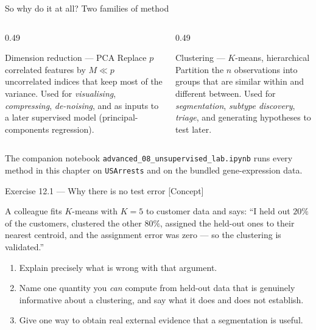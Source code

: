 \documentclass[aspectratio=169,11pt]{beamer}
\begin{document}
\begin{frame}{So why do it at all? Two families of method}
  \footnotesize
  \begin{columns}[t]
    \begin{column}{0.49\textwidth}
      \begin{block}{Dimension reduction --- PCA}
        \footnotesize
        Replace $p$ correlated features by $M \ll p$ uncorrelated indices that keep most of
        the variance. Used for \emph{visualising}, \emph{compressing}, \emph{de-noising},
        and as inputs to a later supervised model (principal-components regression).
      \end{block}
    \end{column}
    \begin{column}{0.49\textwidth}
      \begin{block}{Clustering --- $K$-means, hierarchical}
        \footnotesize
        Partition the $n$ observations into groups that are similar within and different
        between. Used for \emph{segmentation}, \emph{subtype discovery}, \emph{triage},
        and generating hypotheses to test later.
      \end{block}
    \end{column}
  \end{columns}
  \begin{labnote}
    The companion notebook \texttt{advanced\_08\_unsupervised\_lab.ipynb} runs every method in this
    chapter on \texttt{USArrests} and on the bundled gene-expression data.
  \end{labnote}
\end{frame}

\begin{frame}{Exercise 12.1 --- Why there is no test error [Concept]}
\begin{exercise}
  A colleague fits $K$-means with $K=5$ to customer data and says: ``I held out $20\%$ of
  the customers, clustered the other $80\%$, assigned the held-out ones to their nearest
  centroid, and the assignment error was zero --- so the clustering is validated.''
  \begin{enumerate}
    \item Explain precisely what is wrong with that argument.
    \item Name one quantity you \emph{can} compute from held-out data that is genuinely
          informative about a clustering, and say what it does and does not establish.
    \item Give one way to obtain real external evidence that a segmentation is useful.
  \end{enumerate}
\end{exercise}
\end{frame}
\end{document}
